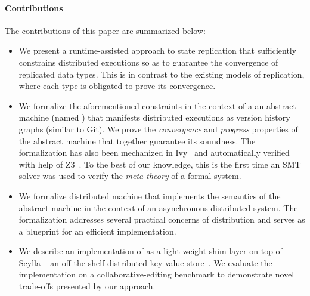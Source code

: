 
\paragraph{Contributions} The contributions of this paper are summarized
below:
\begin{itemize}
  \item We present a runtime-assisted approach to state replication
    that sufficiently constrains distributed executions so as to
    guarantee the convergence of replicated data types. This is in
    contrast to the existing models of replication, where each type is
    obligated to prove its convergence.

  \item We formalize the aforementioned constraints in the context of
    a an abstract machine (named \quark) that manifests distributed
    executions as version history graphs (similar to Git).
    We prove the \emph{convergence} and \emph{progress} properties of
    the \quark abstract machine that together guarantee its soundness.
    The formalization has also been mechanized in Ivy~\cite{ivy} and
    automatically verified with help of Z3~\cite{z3}. To the
    best of our knowledge, this is the first time an SMT solver was
    used to verify the \emph{meta-theory} of a formal system.

  \item We formalize \quark distributed machine that implements the
    semantics of the \quark abstract machine in the context of an
    asynchronous distributed system. The formalization addresses
    several practical concerns of distribution and serves as a
    blueprint for an efficient implementation.

  \item We describe an implementation of \quark as a light-weight shim
    layer on top of Scylla -- an off-the-shelf distributed key-value
    store~\cite{scylla}. We evaluate the implementation on a
    collaborative-editing benchmark to demonstrate novel trade-offs
    presented by our approach.
\end{itemize}


